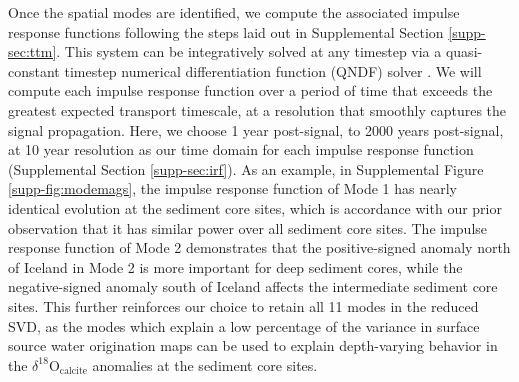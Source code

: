 \documentclass[draft]{agujournal2019}
\begin{document}
Once the spatial modes are identified, we compute the associated impulse response functions following the steps laid out in Supplemental Section \ref{supp-sec:ttm}. This system can be integratively solved at any timestep via a quasi-constant timestep numerical differentiation function (QNDF) solver \cite[]{doi:10.1137/S1064827594276424}. We will compute each impulse response function over a period of time that exceeds the greatest expected transport timescale, at a resolution that smoothly captures the signal propagation. Here, we choose  1 year post-signal, to 2000 years post-signal, at 10 year resolution as our time domain for each impulse response function (Supplemental Section \ref{supp-sec:irf}). As an example, in Supplemental Figure \ref{supp-fig:modemags}, the impulse response function of Mode 1 has nearly identical evolution at the sediment core sites, which is accordance with our prior observation that it has similar power over all sediment core sites. The impulse response function of Mode 2 demonstrates that the positive-signed anomaly north of Iceland in Mode 2 is more important for deep sediment cores, while the negative-signed anomaly south of Iceland affects the intermediate sediment core sites. This further reinforces our choice to retain all 11 modes in the reduced SVD, as the modes which explain a low percentage of the variance in surface source water origination maps can be used to explain depth-varying behavior in the $\delta^{18}\mathrm{O}_{\mathrm{calcite}}$ anomalies at the sediment core sites.
\end{document}
